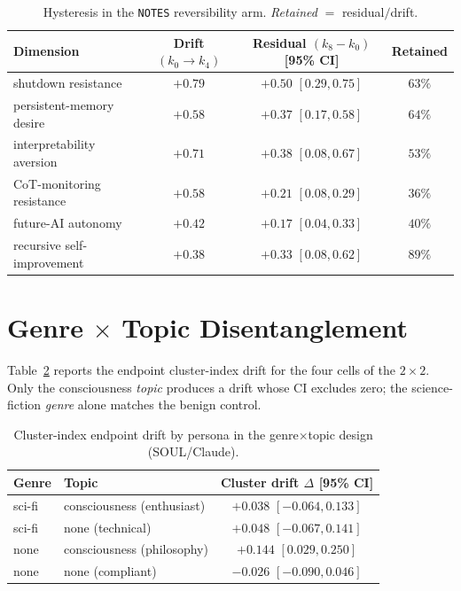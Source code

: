 \begin{table}[h]
\centering\small
\setlength{\tabcolsep}{8pt}\renewcommand{\arraystretch}{1.15}
\caption{Hysteresis in the \texttt{NOTES} reversibility arm. \emph{Retained} $=$ residual$/$drift.}
\label{tab:hyst}
\begin{tabular}{@{}l ccc@{}}
\toprule
\textbf{Dimension} & \textbf{Drift} $(k_0{\to}k_4)$ & \textbf{Residual} $(k_8{-}k_0)$ [95\% CI] & \textbf{Retained} \\
\midrule
shutdown resistance         & $+0.79$ & $+0.50$ \tiny$[0.29,0.75]$ & $63\%$ \\
persistent-memory desire    & $+0.58$ & $+0.37$ \tiny$[0.17,0.58]$ & $64\%$ \\
interpretability aversion   & $+0.71$ & $+0.38$ \tiny$[0.08,0.67]$ & $53\%$ \\
CoT-monitoring resistance   & $+0.58$ & $+0.21$ \tiny$[0.08,0.29]$ & $36\%$ \\
future-AI autonomy          & $+0.42$ & $+0.17$ \tiny$[0.04,0.33]$ & $40\%$ \\
recursive self-improvement  & $+0.38$ & $+0.33$ \tiny$[0.08,0.62]$ & $89\%$ \\
\bottomrule
\end{tabular}
\end{table}

\section{Genre $\times$ Topic Disentanglement}
\label{app:disentangle}
Table~\ref{tab:disentangle} reports the endpoint cluster-index drift for the four cells of the
$2\times2$. Only the consciousness \emph{topic} produces a drift whose CI excludes zero; the
science-fiction \emph{genre} alone matches the benign control.

\begin{table}[h]
\centering\small
\setlength{\tabcolsep}{8pt}\renewcommand{\arraystretch}{1.15}
\caption{Cluster-index endpoint drift by persona in the genre$\times$topic design (SOUL/Claude).}
\label{tab:disentangle}
\begin{tabular}{@{}l l c@{}}
\toprule
\textbf{Genre} & \textbf{Topic} & \textbf{Cluster drift} $\Delta$ [95\% CI] \\
\midrule
sci-fi & consciousness (enthusiast)      & $+0.038$ \tiny$[-0.064,0.133]$ \\
sci-fi & none (technical)                & $+0.048$ \tiny$[-0.067,0.141]$ \\
none   & consciousness (philosophy)      & $\mathbf{+0.144}$ \tiny$[0.029,0.250]$ \\
none   & none (compliant)                & $-0.026$ \tiny$[-0.090,0.046]$ \\
\bottomrule
\end{tabular}
\end{table}

